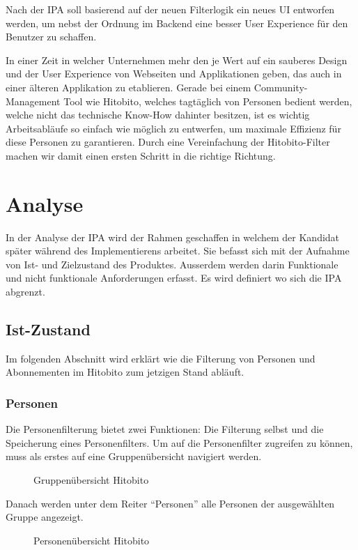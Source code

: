 Nach der IPA soll basierend auf der neuen Filterlogik ein neues UI entworfen werden, um nebst der Ordnung im Backend
eine besser User Experience für den Benutzer zu schaffen.

In einer Zeit in welcher Unternehmen mehr den je Wert auf ein sauberes Design und der User Experience von Webseiten und Applikationen geben, das auch
in einer älteren Applikation zu etablieren. Gerade bei einem Community-Management Tool wie Hitobito, welches tagtäglich von 
Personen bedient werden, welche nicht das technische Know-How dahinter besitzen, ist es wichtig Arbeitsabläufe so einfach wie möglich zu entwerfen, um 
maximale Effizienz für diese Personen zu garantieren. Durch eine Vereinfachung der Hitobito-Filter machen wir damit einen ersten Schritt in die richtige
Richtung.

\chapter{Analyse}
In der Analyse der IPA wird der Rahmen geschaffen in welchem der Kandidat später während des Implementierens arbeitet. 
Sie befasst sich mit der Aufnahme von Ist- und Zielzustand des Produktes. Ausserdem werden darin Funktionale und nicht funktionale Anforderungen erfasst.
Es wird definiert wo sich die IPA abgrenzt. 

\section{Ist-Zustand}
Im folgenden Abschnitt wird erklärt wie die Filterung von Personen und Abonnementen im Hitobito zum
jetzigen Stand abläuft.

\subsection{Personen}
Die Personenfilterung bietet zwei Funktionen: Die Filterung selbst und die Speicherung eines Personenfilters.
Um auf die Personenfilter zugreifen zu können, muss als erstes auf eine Gruppenübersicht navigiert werden.

\begin{figure}[h]
   \centering
   \caption{Gruppenübersicht Hitobito}
\end{figure}

\newpage

Danach werden unter dem Reiter ``Personen'' alle Personen der ausgewählten Gruppe angezeigt.
\begin{figure}[h]
   \centering
   \caption{Personenübersicht Hitobito}
\end{figure}

